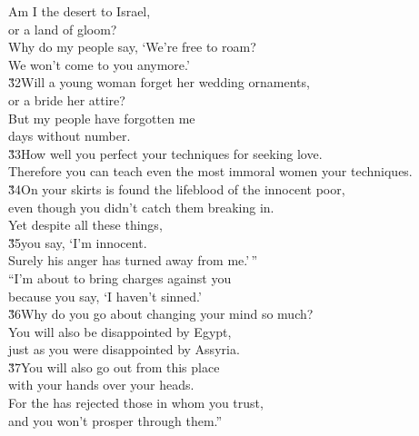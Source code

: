 \begin{poetry}
\poeml Am I the desert to Israel, \\
\poemll    or a land of gloom? \\
\poeml Why do my people say, `We're free to roam? \\
\poemll    We won't come to you anymore.' \\
\poeml \v{32}Will a young woman forget her wedding ornaments, \\
\poemll    or a bride her attire? \\
\poeml But my people have forgotten me \\
\poemll    days without number. \\
\poeml \v{33}How well you perfect your techniques for seeking love. \\
\poemll    Therefore you can teach even the most immoral women your techniques. \\
\poeml \v{34}On your skirts is found the lifeblood of the innocent poor, \\
\poemll    even though you didn't catch them breaking in. \\
\poeml Yet despite all these things, \\
\poeml \v{35}you say, `I'm innocent. \\
\poemlll       Surely his anger has turned away from me.'\,'' \\
\poeml ``I'm about to bring charges against you \\
\poemll    because you say, `I haven't sinned.' \\
\poeml \v{36}Why do you go about changing your mind so much? \\
\poemll    You will also be disappointed by Egypt, \\
\poemlll       just as you were disappointed by Assyria. \\
\poeml \v{37}You will also go out from this place \\
\poemll    with your hands over your heads. \\
\poeml For the  has rejected those in whom you trust, \\
\poemll    and you won't prosper through them.''
\end{poetry}


